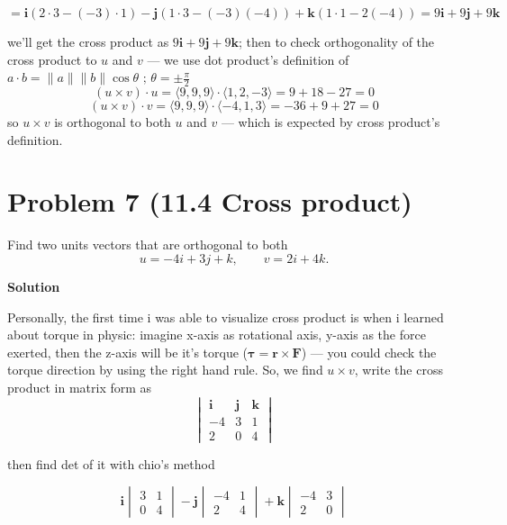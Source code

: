 \documentclass{article}
\newcommand{\solution}{\textbf{\large Solution}}
\theoremstyle{remark}
\begin{document}
  \[
      =
      \mathbf{i}(2 \cdot 3 - (-3) \cdot 1)
      - \mathbf{j}(1 \cdot 3 - (-3)(-4))
      + \mathbf{k}(1 \cdot 1 - 2(-4))
      =
      9\mathbf{i} + 9\mathbf{j} + 9\mathbf{k}
  \]

  we'll get the cross product as $9\mathbf{i} + 9\mathbf{j} + 9\mathbf{k}$; then to check orthogonality of the cross product to $u$ and $v$ --- we use dot product's definition of $a \cdot b = \lVert a \rVert \lVert b \rVert \cos \theta \text{ ; } \theta = \pm\frac{\pi}{2}$
  \[
      (u \times v) \cdot u = \langle 9, 9, 9 \rangle \cdot \langle 1, 2, -3 \rangle = 9 + 18 - 27
  = 0
  \]
  \[
      (u \times v) \cdot v = \langle 9, 9, 9 \rangle \cdot \langle -4, 1, 3 \rangle = -36 + 9 + 27
  = 0
  \]
  so $u \times v$ is orthogonal to both $u$ and $v$ --- which is expected by cross product's definition. 

\vspace{1em}
\hrulefill

\section*{Problem 7 (11.4 Cross product)}
Find two units vectors that are orthogonal to both
\[
    u = -4 i + 3 j + k, \qquad v = 2 i + 4 k.
\]

\medskip
\solution

Personally, the first time i was able to visualize cross product is when i learned about torque in physic: imagine x-axis as rotational axis, y-axis as the force exerted, then the z-axis will be it's torque ($\boldsymbol{\tau} = \mathbf{r} \times \mathbf{F}$) --- you could check the torque direction by using the right hand rule. So, we find $u \times v$, write the cross product in matrix form as
\[
    \begin{vmatrix}
        \mathbf{i} & \mathbf{j} & \mathbf{k} \\
        -4 & 3 & 1 \\
        2 & 0 & 4
    \end{vmatrix}
\]

then find det of it with chio's method

\[
    \mathbf{i}
    \begin{vmatrix}
        3 & 1 \\
        0 & 4
    \end{vmatrix}
    - \mathbf{j}
    \begin{vmatrix}
        -4 & 1 \\
        2 & 4
    \end{vmatrix}
    + \mathbf{k}
    \begin{vmatrix}
        -4 & 3 \\
        2 & 0
    \end{vmatrix}
\]
\end{document}
